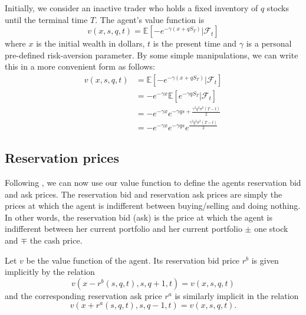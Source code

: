Initially, we consider an inactive trader who holds a fixed inventory of $q$ stocks 
until the terminal time $T.$ The agent's value function is
\begin{equation}\label{eq:3.1}
    v(x,s,q,t)=\mathbb{E}\left[-e^{-\gamma(x+qS_T)}|\mathcal{F}_t\right]
\end{equation}
where $x$ is the initial wealth in dollars, $t$ is the present time and $\gamma$ is 
a personal pre-defined risk-aversion parameter. By some simple manipulations, we can 
write this in a more convenient form as follows:
\begin{align*}
    v(x,s,q,t)&=\mathbb{E}\left[-e^{-\gamma(x+qS_T)}|\mathcal{F}_t\right]\\
    &=-e^{-\gamma x}\mathbb{E}\left[e^{-\gamma q S_T}|\mathcal{F}_t\right]\\
    &=-e^{-\gamma x}e^{-\gamma q s + \frac{\gamma^2q^2\sigma^2(T-t)}{2}}\\
    &=-e^{-\gamma x}e^{-\gamma q s}e^{\frac{\gamma^2q^2\sigma^2(T-t)}{2}}
\end{align*}

\subsection*{Reservation prices}

Following \cite{AS2008}, we can now use our value function to define the agents 
reservation bid and ask prices.
The reservation bid and reservation ask prices are simply the prices at which the agent
is indifferent between buying/selling and doing nothing. In other words, the reservation
bid (ask) is the price at which the agent is indifferent between her current portfolio
and her current portfolio $\pm$ one stock and $\mp$ the cash price.

\begin{definition}\label{def:3.3.1}
    Let $v$ be the value function of the agent. Its reservation bid price $r^b$ is
    given implicitly by the relation
    \begin{equation}\label{eq:3.2}
        v(x-r^b(s,q,t),s,q+1,t)=v(x,s,q,t)
    \end{equation}
    and the corresponding reservation ask price $r^a$ is similarly implicit in the 
    relation
    \begin{equation}\label{eq:3.3}
        v(x+r^a(s,q,t),s,q-1,t)=v(x,s,q,t).
    \end{equation}
\end{definition}

